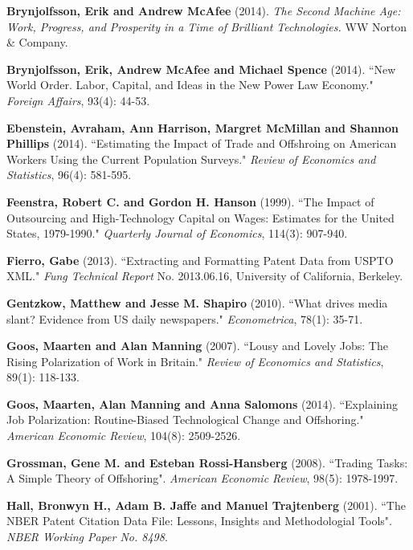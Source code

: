 \documentclass[11pt,a4paper]{article}
\begin{document}
\begin{thebibliography}{9}
	 \textbf{Brynjolfsson, Erik and Andrew McAfee} (2014). \textit{The Second Machine Age: Work, Progress, and Prosperity in a Time of Brilliant Technologies.} WW Norton \& Company.
	
		\textbf{Brynjolfsson, Erik, Andrew McAfee and Michael Spence} (2014). ``New World Order. Labor, Capital, and Ideas in the New Power Law Economy." \textit{Foreign Affairs}, 93(4): 44-53.
	
	 \textbf{Ebenstein, Avraham, Ann Harrison, Margret McMillan and Shannon Phillips} (2014). ``Estimating the Impact of Trade and Offshroing on American Workers Using the Current Population Surveys." \textit{Review of Economics and Statistics}, 96(4): 581-595. 
	
	 \textbf{Feenstra, Robert C. and Gordon H. Hanson} (1999). ``The Impact of Outsourcing and High-Technology Capital on Wages: Estimates for the United States, 1979-1990." \textit{Quarterly Journal of Economics}, 114(3): 907-940.

	 \textbf{Fierro, Gabe} (2013). ``Extracting and Formatting Patent Data from USPTO XML." \textit{Fung Technical Report} No. 2013.06.16, University of California, Berkeley.
	
	 \textbf{Gentzkow, Matthew and Jesse M. Shapiro} (2010). ``What drives media slant? Evidence from US daily newspapers." \textit{Econometrica}, 78(1): 35-71.

	 \textbf{Goos, Maarten and Alan Manning} (2007). ``Lousy and Lovely Jobs: The Rising Polarization of Work in Britain." \textit{Review of Economics and Statistics}, 89(1): 118-133.
	
	 \textbf{Goos, Maarten, Alan Manning and Anna Salomons} (2014). ``Explaining Job Polarization: Routine-Biased Technological Change and Offshoring." \textit{American Economic Review}, 104(8): 2509-2526.
	
	 \textbf{Grossman, Gene M. and Esteban Rossi-Hansberg} (2008). ``Trading Tasks: A Simple Theory of Offshoring". \textit{American Economic Review}, 98(5): 1978-1997.

	 \textbf{Hall, Bronwyn H., Adam B. Jaffe and Manuel Trajtenberg} (2001). ``The NBER Patent Citation Data File: Lessons, Insights and Methodologial Tools". \textit{NBER Working Paper No. 8498}.
	

\end{thebibliography}
\end{document}

